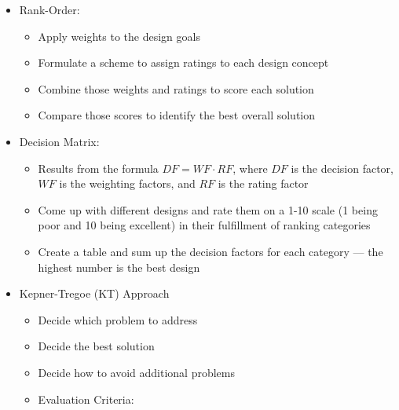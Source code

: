\begin{itemize}

  \item Rank-Order:

    \begin{itemize}

      \item Apply weights to the design goals

      \item Formulate a scheme to assign ratings to each design concept

      \item Combine those weights and ratings to score each solution

      \item Compare those scores to identify the best overall solution

    \end{itemize}

  \item Decision Matrix:

    \begin{itemize}

      \item Results from the formula $DF = WF\cdot RF$, where $DF$ is the decision factor, $WF$ is the weighting factors, and $RF$ is the rating factor

      \item Come up with different designs and rate them on a 1-10 scale (1 being poor and 10 being excellent) in their fulfillment of ranking categories

      \item Create a table and sum up the decision factors for each category — the highest number is the best design

    \end{itemize}

  \item Kepner-Tregoe (KT) Approach

    \begin{itemize}

      \item Decide which problem to address

      \item Decide the best solution

      \item Decide how to avoid additional problems

      \item Evaluation Criteria:


\end{itemize}
\end{itemize}
